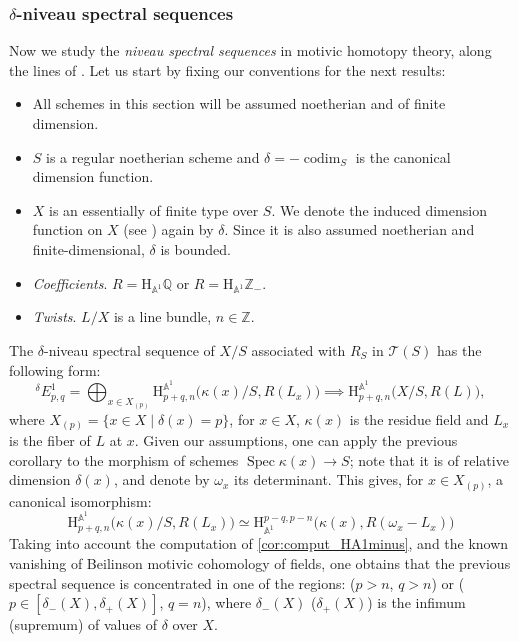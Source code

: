 \documentclass[JEP,XML,SOM,Unicode]{cedram}
\newcommand{\T}{\mathscr T}
\renewcommand{\AA}{\mathbb A}
\newcommand{\HA}{\mathrm H_{\AA^1}}
\newcommand{\BA}{\mathrm H^{\AA^1}}
\DeclareMathOperator{\codim}{codim}
\DeclareMathOperator{\spec}{Spec}
\newcommand{\ZZ} {\mathbb Z}
\newcommand{\QQ} {\mathbb Q}
\theoremstyle{remark}
\theoremstyle{definition}
\newcommand{\numer}[1]{\refstepcounter{thm}\subsubsection{#1}}
\numberwithin{equation}{thm}
\begin{document}
\numer{$\delta$-niveau spectral sequences}\label{num:coniveau}
Now we study the \emph{niveau spectral sequences} in motivic homotopy theory, along the lines of \cite[\S 3.1]{BD1}.
Let us start by fixing our conventions for the next results:
\begin{itemize}
\item All schemes in this section will be assumed noetherian and of finite dimension.
\item $S$ is a regular noetherian scheme and $\delta=-\codim_S$ is the canonical dimension function.
\item $X$ is an essentially of finite type over $S$.
We denote the induced dimension function on $X$ (see \cite[1.1.7]{BD1}) again by $\delta$.
Since it is also assumed noetherian and finite-dimensional, $\delta$ is bounded.
\item \emph{Coefficients}. $R=\HA \QQ$ or $R=\HA \ZZ_-$.
\item \emph{Twists}.
$L/X$ is a line bundle, $n \in \ZZ$.
\end{itemize}

The $\delta$-niveau spectral sequence of $X/S$ associated with $R_S$ in $\T(S)$
has the following form:
\begin{equation*}\label{eq:nivss}
{}^\delta E^1_{p,q}=\bigoplus_{x \in X_{(p)}} \BA_{p+q,n}\big(\kappa(x)/S,R(L_x)\big) \implies \BA_{p+q,n}\big(X/S,R(L)\big),
\end{equation*}
where $X_{(p)}=\{x \in X \mid \delta(x)=p\}$, for $x \in X$, $\kappa(x)$ is the residue field and $L_x$ is the fiber of $L$ at $x$.
Given our assumptions, one can apply the previous corollary to
the morphism of schemes $\spec{\kappa(x)} \to S$; note that it is of relative dimension $\delta(x)$,
and denote by $\omega_x$ its determinant. This gives, for $x \in X_{(p)}$, a canonical isomorphism:
\begin{equation*}
\BA_{p+q,n}\big(\kappa(x)/S,R(L_x)\big) \simeq \HA^{p-q,p-n}\big(\kappa(x),R(\omega_x-L_x)\big)
\end{equation*}
Taking into account the computation of \eqref{cor:comput_HA1minus}, and the known vanishing of Beilinson motivic cohomology
of fields, one obtains that the previous spectral sequence is concentrated in one of the regions: ($p>n$, $q>n$)
or ($p \in [\delta_-(X),\delta_+(X)]$, $q=n$), where $\delta_-(X)$ (\resp $\delta_+(X)$) is the infimum (\resp supremum) of values of $\delta$ over $X$.
\end{document}
